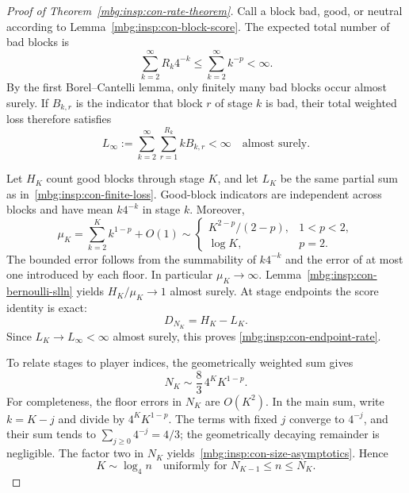 \documentclass[11pt,letterpaper]{article}
\theoremstyle{definition}
\begin{document}
\begin{proof}[Proof of Theorem~\ref{mbg:insp:con-rate-theorem}]
Call a block bad, good, or neutral according to
Lemma~\ref{mbg:insp:con-block-score}.  The expected total number of bad blocks is
\[
 \sum_{k=2}^{\infty}R_k4^{-k}
 \leq\sum_{k=2}^{\infty}k^{-p}<\infty.
\]
By the first Borel--Cantelli lemma, only finitely many bad blocks occur
almost surely.  If $B_{k,r}$ is the indicator that block $r$ of stage $k$ is
bad, their total weighted loss therefore satisfies
\begin{equation}\label{mbg:insp:con-finite-loss}
 L_\infty:=\sum_{k=2}^{\infty}\sum_{r=1}^{R_k}kB_{k,r}<\infty
 \quad\text{almost surely}.
\end{equation}

Let $H_K$ count good blocks through stage $K$, and let $L_K$ be the same
partial sum as in~\eqref{mbg:insp:con-finite-loss}.  Good-block indicators are
independent across blocks and have mean $k4^{-k}$ in stage $k$.  Moreover,
\begin{equation}\label{mbg:insp:con-mu-asymptotics}
 \mu_K=\sum_{k=2}^{K}k^{1-p}+O(1)
 \sim
 \begin{cases}
 K^{2-p}/(2-p),&1<p<2,\\
 \log K,&p=2.
 \end{cases}
\end{equation}
The bounded error follows from the summability of $k4^{-k}$ and the error
of at most one introduced by each floor.  In particular $\mu_K\to\infty$.
Lemma~\ref{mbg:insp:con-bernoulli-slln} yields $H_K/\mu_K\to1$ almost surely.
At stage endpoints the score identity is exact:
\begin{equation}\label{mbg:insp:con-score-decomposition}
 D_{N_K}=H_K-L_K.
\end{equation}
Since $L_K\to L_\infty<\infty$ almost surely, this proves
\eqref{mbg:insp:con-endpoint-rate}.

To relate stages to player indices, the geometrically weighted sum gives
\begin{equation}\label{mbg:insp:con-size-asymptotics}
 N_K\sim\frac{8}{3}\,4^K K^{1-p}.
\end{equation}
For completeness, the floor errors in $N_K$ are $O(K^2)$.  In the main sum,
write $k=K-j$ and divide by $4^K K^{1-p}$.  The terms with fixed $j$ converge
to $4^{-j}$, and their sum tends to $\sum_{j\geq0}4^{-j}=4/3$;
the geometrically decaying remainder is negligible.  The factor two in
$N_K$ yields~\eqref{mbg:insp:con-size-asymptotics}.  Hence
\begin{equation}\label{mbg:insp:con-stage-log}
 K\sim\log_4 n
 \quad\text{uniformly for }N_{K-1}\leq n\leq N_K.
\end{equation}


\end{proof}
\end{document}
